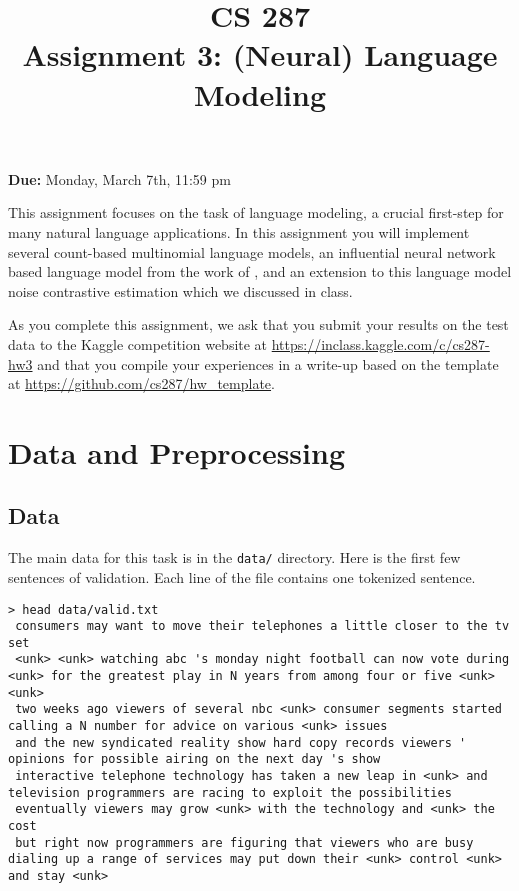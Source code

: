 \documentclass[11pt]{article}
\title{CS 287 \\ Assignment 3: (Neural) Language Modeling }
\date{}
\begin{document}
\maketitle{}

\begin{center}
  \textbf{Due:} Monday, March 7th, 11:59 pm 
\end{center}


This assignment focuses on the task of language modeling, a crucial
first-step for many natural language applications. In this assignment you
will implement several count-based multinomial language models, an
influential neural network based language model from the work of
\citet{DBLP:journals/jmlr/BengioDVJ03}, and an extension to this
language model noise contrastive estimation which we discussed in
class.


As you complete this assignment, we ask that you submit your results
on the test data to the Kaggle competition website at
\url{https://inclass.kaggle.com/c/cs287-hw3} and that you compile your
experiences in a write-up based on the template at
\url{https://github.com/cs287/hw_template}.

\section{Data and Preprocessing}

\subsection{Data}

The main data for this task is in the \texttt{data/} directory. Here
is the first few sentences of validation. Each line of the file
contains one tokenized sentence.

\lstset{ basicstyle=\ttfamily, breaklines=true}

\begin{lstlisting}
> head data/valid.txt 
 consumers may want to move their telephones a little closer to the tv set 
 <unk> <unk> watching abc 's monday night football can now vote during <unk> for the greatest play in N years from among four or five <unk> <unk> 
 two weeks ago viewers of several nbc <unk> consumer segments started calling a N number for advice on various <unk> issues 
 and the new syndicated reality show hard copy records viewers ' opinions for possible airing on the next day 's show 
 interactive telephone technology has taken a new leap in <unk> and television programmers are racing to exploit the possibilities 
 eventually viewers may grow <unk> with the technology and <unk> the cost 
 but right now programmers are figuring that viewers who are busy dialing up a range of services may put down their <unk> control <unk> and stay <unk> 

\end{lstlisting}
\end{document}
